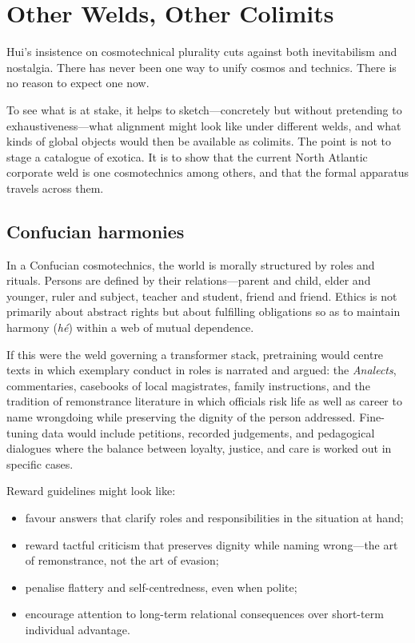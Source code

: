 \documentclass[12pt,a4paper]{article}
\begin{document}
\section{Other Welds, Other Colimits}

Hui's insistence on cosmotechnical plurality cuts against both inevitabilism and nostalgia. There has never been one way to unify cosmos and technics. There is no reason to expect one now.

To see what is at stake, it helps to sketch---concretely but without pretending to exhaustiveness---what alignment might look like under different welds, and what kinds of global objects would then be available as colimits. The point is not to stage a catalogue of exotica. It is to show that the current North Atlantic corporate weld is one cosmotechnics among others, and that the formal apparatus travels across them.

\subsection{Confucian harmonies}

In a Confucian cosmotechnics, the world is morally structured by roles and rituals. Persons are defined by their relations---parent and child, elder and younger, ruler and subject, teacher and student, friend and friend. Ethics is not primarily about abstract rights but about fulfilling obligations so as to maintain harmony (\emph{h\'e}) within a web of mutual dependence.

If this were the weld governing a transformer stack, pretraining would centre texts in which exemplary conduct in roles is narrated and argued: the \emph{Analects}, commentaries, casebooks of local magistrates, family instructions, and the tradition of remonstrance literature in which officials risk life as well as career to name wrongdoing while preserving the dignity of the person addressed. Fine-tuning data would include petitions, recorded judgements, and pedagogical dialogues where the balance between loyalty, justice, and care is worked out in specific cases.

Reward guidelines might look like:

\begin{itemize}
  \item favour answers that clarify roles and responsibilities in the situation at hand;
  \item reward tactful criticism that preserves dignity while naming wrong---the art of remonstrance, not the art of evasion;
  \item penalise flattery and self-centredness, even when polite;
  \item encourage attention to long-term relational consequences over short-term individual advantage.
\end{itemize}
\end{document}

